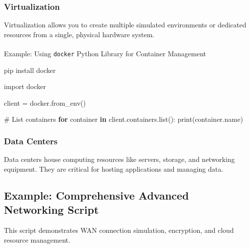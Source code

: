 \documentclass[
  letterpaper,
  DIV=11,
  numbers=noendperiod]{scrreprt}
\makeatletter
\let\oldparagraph\paragraph
\renewcommand{\paragraph}{
    \@ifstar
      \xxxParagraphStar
      \xxxParagraphNoStar
  }
\newcommand{\xxxParagraphStar}[1]{\oldparagraph*{#1}\mbox{}}
\newcommand{\xxxParagraphNoStar}[1]{\oldparagraph{#1}\mbox{}}
\newenvironment{Shaded}{\begin{snugshade}}{\end{snugshade}}
\newcommand{\BuiltInTok}[1]{\textcolor[rgb]{0.00,0.23,0.31}{#1}}
\newcommand{\CommentTok}[1]{\textcolor[rgb]{0.37,0.37,0.37}{#1}}
\newcommand{\ControlFlowTok}[1]{\textcolor[rgb]{0.00,0.23,0.31}{\textbf{#1}}}
\newcommand{\ExtensionTok}[1]{\textcolor[rgb]{0.00,0.23,0.31}{#1}}
\newcommand{\ImportTok}[1]{\textcolor[rgb]{0.00,0.46,0.62}{#1}}
\newcommand{\KeywordTok}[1]{\textcolor[rgb]{0.00,0.23,0.31}{\textbf{#1}}}
\newcommand{\NormalTok}[1]{\textcolor[rgb]{0.00,0.23,0.31}{#1}}
\newcommand{\OperatorTok}[1]{\textcolor[rgb]{0.37,0.37,0.37}{#1}}
\makeatother
\begin{document}
\subsubsection{Virtualization}\label{virtualization}

Virtualization allows you to create multiple simulated environments or
dedicated resources from a single, physical hardware system.

\paragraph{\texorpdfstring{Example: Using \texttt{docker} Python Library
for Container
Management}{Example: Using docker Python Library for Container Management}}\label{example-using-docker-python-library-for-container-management}

\begin{Shaded}
\begin{Highlighting}[]
\ExtensionTok{pip}\NormalTok{ install docker}
\end{Highlighting}
\end{Shaded}

\begin{Shaded}
\begin{Highlighting}[]
\ImportTok{import}\NormalTok{ docker}

\NormalTok{client }\OperatorTok{=}\NormalTok{ docker.from\_env()}

\CommentTok{\# List containers}
\ControlFlowTok{for}\NormalTok{ container }\KeywordTok{in}\NormalTok{ client.containers.}\BuiltInTok{list}\NormalTok{():}
    \BuiltInTok{print}\NormalTok{(container.name)}
\end{Highlighting}
\end{Shaded}

\subsubsection{Data Centers}\label{data-centers}

Data centers house computing resources like servers, storage, and
networking equipment. They are critical for hosting applications and
managing data.

\subsection{Example: Comprehensive Advanced Networking
Script}\label{example-comprehensive-advanced-networking-script}

This script demonstrates WAN connection simulation, encryption, and
cloud resource management.
\end{document}
